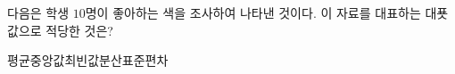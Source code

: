 다음은 학생 $10$명이 좋아하는 색을 조사하여 나타낸 것이다. 이 자료를 대표하는 대푯값으로 적당한 것은?
\begin{choices32}{평균}{중앙값}{최빈값}{분산}{표준편차}\end{choices32}

